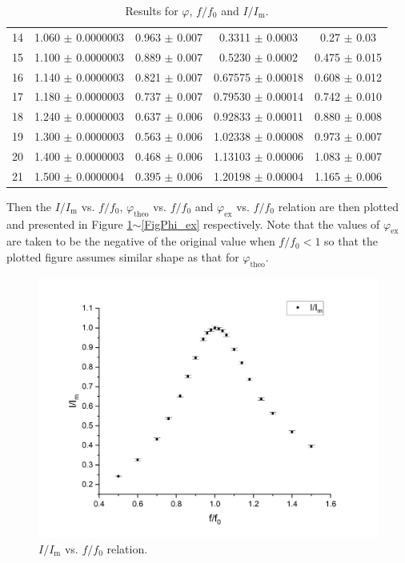 \documentclass{article}
\begin{document}
\begin{table}[H]
\begin{tabular}{ccccc}
        14 & 1.060 $\pm$ 0.0000003 & 0.963  $\pm$ 0.007  & 0.3311   $\pm$ 0.0003               & 0.27   $\pm$ 0.03                 \\
        15 & 1.100 $\pm$ 0.0000003 & 0.889  $\pm$ 0.007  & 0.5230   $\pm$ 0.0002               & 0.475  $\pm$ 0.015                \\
        16 & 1.140 $\pm$ 0.0000003 & 0.821  $\pm$ 0.007  & 0.67575  $\pm$ 0.00018              & 0.608  $\pm$ 0.012                \\
        17 & 1.180 $\pm$ 0.0000003 & 0.737  $\pm$ 0.007  & 0.79530  $\pm$ 0.00014              & 0.742  $\pm$ 0.010                \\
        18 & 1.240 $\pm$ 0.0000003 & 0.637  $\pm$ 0.006  & 0.92833  $\pm$ 0.00011              & 0.880  $\pm$ 0.008                \\
        19 & 1.300 $\pm$ 0.0000003 & 0.563  $\pm$ 0.006  & 1.02338  $\pm$ 0.00008              & 0.973  $\pm$ 0.007                \\
        20 & 1.400 $\pm$ 0.0000003 & 0.468  $\pm$ 0.006  & 1.13103  $\pm$ 0.00006              & 1.083  $\pm$ 0.007                \\
        21 & 1.500 $\pm$ 0.0000004 & 0.395  $\pm$ 0.006  & 1.20198  $\pm$ 0.00004              & 1.165  $\pm$ 0.006                \\
        \bottomrule
    \end{tabular}
    \caption{Results for $\varphi$, $f/f_0$ and $I/I_\text{m}$.}\label{TablePhi}
\end{table}

Then the $I/I_\text{m}$ vs. $f/f_0$, $\varphi_{\text{theo}}$ vs. $f/f_0$ and $\varphi_\text{ex}$ vs. $f/f_0$ relation are then plotted and presented in Figure \ref{FigIIm}$\sim$\ref{FigPhi_ex} respectively. Note that the values of $\varphi_\text{ex}$ are taken to be the negative of the original value when $f/f_0 < 1$ so that the plotted figure assumes similar shape as that for $\varphi_{\text{theo}}$.

\begin{figure}[H]\centering
    \includegraphics[scale=0.38]{IImff0.png}
    \caption{$I/I_\text{m}$ vs. $f/f_0$ relation.}\label{FigIIm}
\end{figure}
\end{document}
